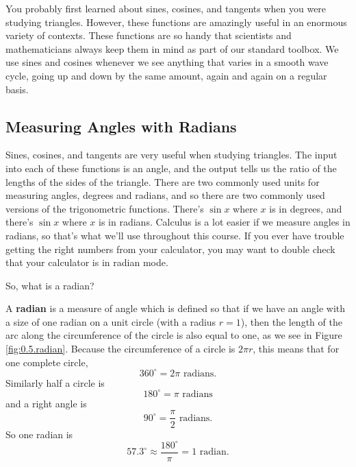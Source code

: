 You probably first learned about sines, cosines, and tangents when you were studying triangles.  However, these functions are amazingly useful in an enormous variety of contexts.  These functions are so handy that scientists and mathematicians always keep them in mind as part of our standard toolbox.  We use sines and cosines whenever we see anything that varies in a smooth wave cycle, going up and down by the same amount, again and again on a regular basis.





\subsection*{Measuring Angles with Radians}

Sines, cosines, and tangents are very useful when studying triangles.  The input into each
of these functions is an angle, and the output tells us the ratio of the lengths of the
sides of the triangle.  There are two commonly used units for measuring angles, degrees
and radians, and so there are two commonly used versions of the trigonometric functions.
There's $\sin x$ where $x$ is in degrees, and there's $\sin x$ where $x$ is in radians.
Calculus is a lot easier if we measure angles in radians, so that's what we'll use
throughout this course.  If you ever have trouble getting the right numbers from your
calculator, you may want to double check that your calculator is in radian mode.

So, what is a radian?  

\begin{definition}
    A {\bf radian} is a measure of angle which is defined so that if we have an angle with
    a size of one radian on a unit circle (with a radius $r= 1$), then the length of the
    arc along the circumference of the circle is also equal to one, as we see in Figure
    \ref{fig:0.5.radian}.  Because the circumference of a circle is $2 \pi r$, this means
    that for one complete circle, 
    \[ 360^\circ = 2 \pi \text{ radians.} \]
    Similarly half a circle is
    \[ 180^\circ = \pi \text{ radians} \]
    and a right angle is 
    \[ 90^\circ = \frac{\pi}{2} \text{ radians.} \]  
    So one radian is 
    \[ 57.3^\circ \approx \frac{180^\circ}{\pi} = 1 \text{ radian}. \]
\end{definition}

% 

